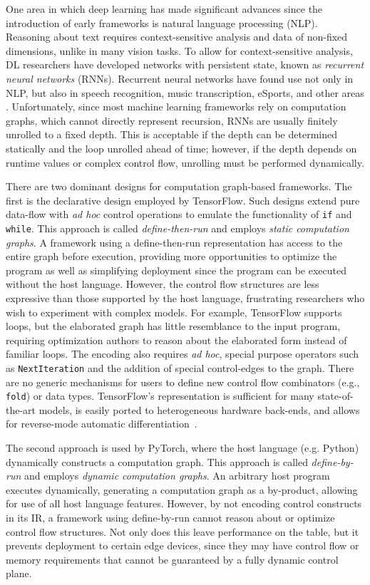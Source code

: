One area in which deep learning has made significant advances since
  the introduction of early frameworks is natural language processing (NLP).
Reasoning about text requires context-sensitive analysis and data of
    non-fixed dimensions, unlike in many vision tasks.
 To allow for context-sensitive analysis, DL researchers have developed networks with persistent
  state, known as \textit{recurrent neural networks}  (RNNs).
Recurrent neural networks have found use not only in NLP, but also in speech recognition, music
  transcription, eSports, and other areas \cite{lstm, speech_recognition, OpenAI_dota}.
Unfortunately, since most machine learning frameworks rely on computation graphs,
  which cannot directly represent recursion, RNNs are usually finitely unrolled to a fixed depth.
This is acceptable if the depth can be determined statically and the loop unrolled
  ahead of time; however, if the depth depends on runtime values or complex control flow,
  unrolling must be performed dynamically.

There are two dominant designs for computation graph-based frameworks.
The first is the declarative design employed by TensorFlow.
Such designs extend pure data-flow with \textit{ad hoc} control operations
  to emulate the functionality of \verb|if| and \verb|while|.
This approach is called \textit{define-then-run} and employs \textit{static
computation graphs}.
A framework using a define-then-run representation has access to the entire
  graph before execution, providing more opportunities to optimize the program
  as well as simplifying deployment since the program can be executed
  without the host language.
However, the control flow structures are less expressive than those supported
  by the host language, frustrating researchers who wish to experiment with complex models.
For example, TensorFlow supports loops,
  but the elaborated graph has little resemblance to the input program, requiring optimization
  authors to reason about the elaborated form instead of familiar loops.
The encoding also requires \textit{ad hoc}, special purpose operators such
  as \verb|NextIteration| and the addition of special control-edges to the graph.
There are no generic mechanisms for users to define new control flow
  combinators (e.g., \verb|fold|) or data types.
TensorFlow's representation is sufficient for many state-of-the-art models,
  is easily ported to heterogeneous hardware back-ends,
  and allows for reverse-mode automatic differentiation~{\cite{ad_survey, tensorflow}}.

The second approach is used by PyTorch, where the host language (e.g. Python) dynamically
  constructs a computation graph.
This approach is called \textit{define-by-run} and employs \textit{dynamic computation graphs}.
An arbitrary host program executes dynamically, generating a computation graph as a by-product,
  allowing for use of all host language features.
However, by not encoding control constructs in its IR, a framework
  using define-by-run cannot reason about or optimize control flow structures.
Not only does this leave performance on the table, but it prevents deployment to certain
  edge devices, since they may have control flow or memory requirements that cannot be
  guaranteed by a fully dynamic control plane.

